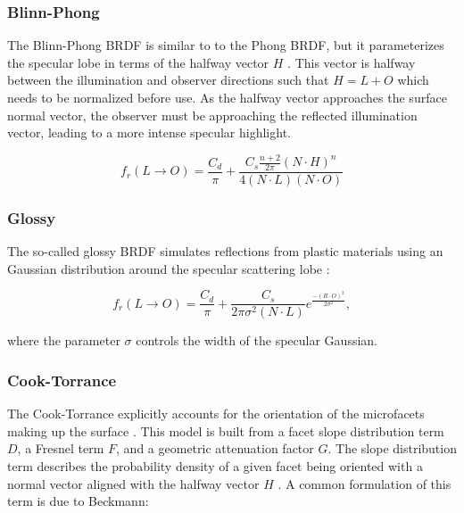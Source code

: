 \subsubsection{Blinn-Phong}

The Blinn-Phong BRDF is similar to to the Phong BRDF, but it parameterizes the specular lobe in terms of the halfway vector $H$ \cite{duvenhage2013}. This vector is halfway between the illumination and observer directions such that $H = L + O$ which needs to be normalized before use. As the halfway vector approaches the surface normal vector, the observer must be approaching the reflected illumination vector, leading to a more intense specular highlight. 

\begin{equation} \label{eq:brdf_blinn_phong}
  f_r(L \rightarrow O) = \frac{C_d}{\pi} + \frac{C_s \frac{n+2}{2\pi} (N \cdot H)^n}{4 (N \cdot L)(N \cdot O)}
\end{equation}

\subsubsection{Glossy}

The so-called glossy BRDF simulates reflections from plastic materials using an Gaussian distribution around the specular scattering lobe \cite{duvenhage2013}:

\begin{equation} \label{eq:brdf_glossy}
  f_r(L \rightarrow O) = \frac{C_d}{\pi} + \frac{C_s}{2\pi \sigma^2 \left(N \cdot L\right)}  e^{\frac{-\left( R \cdot O \right)^2}{2\sigma^2}},
\end{equation}

where the parameter $\sigma$ controls the width of the specular Gaussian.

\subsubsection{Cook-Torrance}

The Cook-Torrance explicitly accounts for the orientation of the microfacets making up the surface \cite{cook1982}. This model is built from a facet slope distribution term $D$, a Fresnel term $F$, and a geometric attenuation factor $G$. The slope distribution term describes the probability density of a given facet being oriented with a normal vector aligned with the halfway vector $H$ \cite{cook1982}. A common formulation of this term is due to Beckmann:

